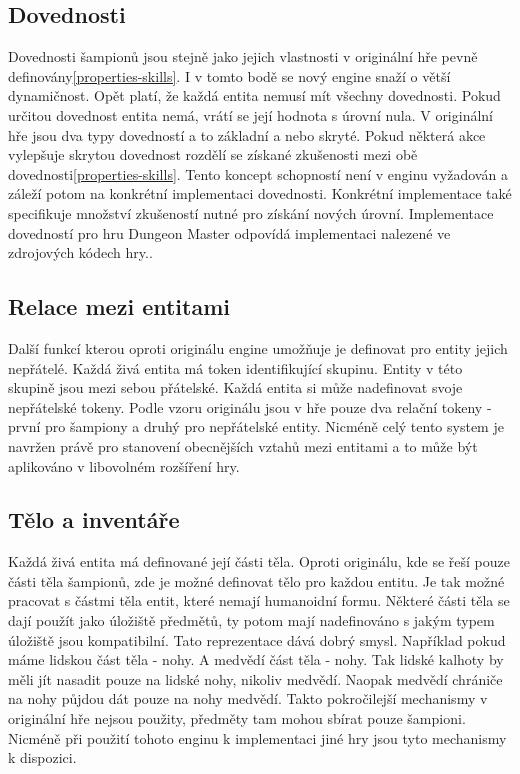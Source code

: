  \subsection{Dovednosti}

 Dovednosti šampionů jsou stejně jako jejich vlastnosti v originální hře pevně definovány\vref{properties-skills}. I v tomto bodě se nový engine snaží o větší
 dynamičnost. Opět platí, že každá entita nemusí mít všechny dovednosti. Pokud určitou dovednost entita nemá, vrátí se její hodnota s úrovní nula.
 V originální hře jsou dva typy dovedností a to základní a nebo skryté. Pokud některá akce vylepšuje skrytou dovednost
 rozdělí se získané zkušenosti mezi obě dovednosti\vref{properties-skills}. Tento koncept schopností není v enginu vyžadován a 
 záleží potom na konkrétní implementaci dovednosti. Konkrétní implementace také specifikuje množství zkušeností nutné pro 
 získání nových úrovní. Implementace dovedností pro hru Dungeon Master odpovídá implementaci nalezené ve zdrojových kódech hry.\cite{DMDecompilation}.

 \subsection{Relace mezi entitami}
 Další funkcí kterou oproti originálu engine umožňuje je definovat pro entity jejich nepřátelé. Každá živá entita má token identifikující
 skupinu. Entity v této skupině jsou mezi sebou přátelské. Každá entita si může nadefinovat svoje nepřátelské tokeny.
 Podle vzoru originálu jsou v hře pouze dva relační tokeny - první pro šampiony a druhý pro nepřátelské entity. Nicméně
 celý tento system je navržen právě pro stanovení obecnějších vztahů mezi entitami a to může být aplikováno v libovolném rozšíření hry.
 
\subsection{Tělo a inventáře}
Každá živá entita má definované její části těla. Oproti originálu, kde se řeší pouze části těla šampionů,
zde je možné definovat tělo pro každou entitu. Je tak možné pracovat s částmi těla entit, které nemají humanoidní formu.
Některé části těla se dají použít jako úložiště předmětů, ty potom mají nadefinováno s jakým typem úložiště jsou kompatibilní.
Tato reprezentace dává dobrý smysl. Například pokud máme lidskou část těla - nohy. A medvědí část těla - nohy. Tak lidské
kalhoty by měli jít nasadit pouze na lidské nohy, nikoliv medvědí. Naopak medvědí chrániče na nohy půjdou dát pouze na
nohy medvědí. Takto pokročilejší mechanismy v originální hře nejsou použity, předměty tam mohou sbírat pouze šampioni. Nicméně
při použití tohoto enginu k implementaci jiné hry jsou tyto mechanismy k dispozici. 

